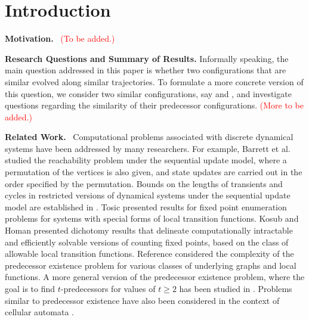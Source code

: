\section{Introduction}
\label{sec:intro}

\noindent
\textbf{Motivation.}~ \textcolor{red}{(To be added.)}


\smallskip

\noindent
\textbf{Research Questions and Summary of Results.} Informally speaking,
the main question addressed in this paper is whether two configurations
that are similar evolved along similar trajectories.
To formulate a more concrete version of this question, we consider
two similar configurations, say \calcone{} and \calctwo, and
investigate questions regarding the similarity of their predecessor
configurations.
\textcolor{red}{(More to be added.)}


\smallskip

\noindent
\textbf{Related Work.}~
Computational problems associated with 
discrete dynamical systems 
have been addressed by many researchers.
For example, Barrett et al. \cite{BH+06} studied the
reachability problem under the sequential
update model, where a permutation of the vertices is also given,
and state updates are carried out in the order specified by the
permutation.  
Bounds on the lengths of transients and cycles in restricted versions
of dynamical systems under the sequential update model are established
in \cite{MR-2007}.  
Tosic \cite{Tos-2010,Tosic-2017} presented results for fixed point enumeration
problems for systems with special forms of local transition
functions.  Kosub and Homan \cite{KH-2007} presented dichotomy
results that delineate computationally intractable and efficiently
solvable versions of counting fixed points, based on the class of
allowable local transition functions.  
Reference \cite{BH+07} considered the complexity
of the predecessor existence problem for various classes
of underlying graphs and local functions.
A more general version of the predecessor existence problem,
where the goal is to find $t$-predecessors for values of $t \geq 2$
has been studied in \cite{Kawachi-et-al-2017,MR+2018}.
Problems similar to predecessor existence have
also been considered in the context of cellular automata
\cite{Gre-1987,Dur-1994}.
